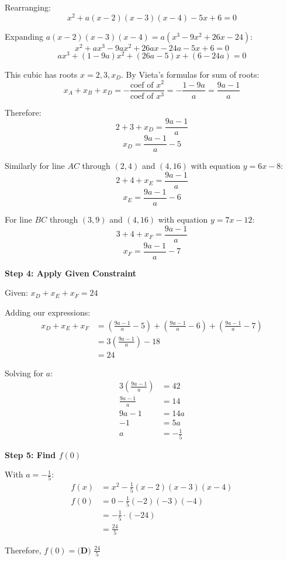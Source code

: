 \documentclass[]{article}
\begin{document}
\begin{solutionbox}
Rearranging:
\[x^2 + a(x-2)(x-3)(x-4) - 5x + 6 = 0\]

Expanding $a(x-2)(x-3)(x-4) = a(x^3 - 9x^2 + 26x - 24)$:
\[x^2 + ax^3 - 9ax^2 + 26ax - 24a - 5x + 6 = 0\]
\[ax^3 + (1-9a)x^2 + (26a-5)x + (6-24a) = 0\]

This cubic has roots $x = 2, 3, x_D$. By Vieta's formulas for sum of roots:
\[x_A + x_B + x_D = -\frac{\text{coef of } x^2}{\text{coef of } x^3} = -\frac{1-9a}{a} = \frac{9a-1}{a}\]

Therefore:
\[2 + 3 + x_D = \frac{9a-1}{a}\]
\[x_D = \frac{9a-1}{a} - 5\]

Similarly for line $AC$ through $(2,4)$ and $(4,16)$ with equation $y = 6x - 8$:
\[2 + 4 + x_E = \frac{9a-1}{a}\]
\[x_E = \frac{9a-1}{a} - 6\]

For line $BC$ through $(3,9)$ and $(4,16)$ with equation $y = 7x - 12$:
\[3 + 4 + x_F = \frac{9a-1}{a}\]
\[x_F = \frac{9a-1}{a} - 7\]

\textbf{Step 4: Apply Given Constraint}

Given: $x_D + x_E + x_F = 24$

Adding our expressions:
\begin{align*}
x_D + x_E + x_F &= \left(\frac{9a-1}{a} - 5\right) + \left(\frac{9a-1}{a} - 6\right) + \left(\frac{9a-1}{a} - 7\right) \\
&= 3\left(\frac{9a-1}{a}\right) - 18 \\
&= 24
\end{align*}

Solving for $a$:
\begin{align*}
3\left(\frac{9a-1}{a}\right) &= 42 \\
\frac{9a-1}{a} &= 14 \\
9a - 1 &= 14a \\
-1 &= 5a \\
a &= -\frac{1}{5}
\end{align*}

\textbf{Step 5: Find $f(0)$}

With $a = -\frac{1}{5}$:
\begin{align*}
f(x) &= x^2 - \frac{1}{5}(x-2)(x-3)(x-4) \\
f(0) &= 0 - \frac{1}{5}(-2)(-3)(-4) \\
&= -\frac{1}{5} \cdot (-24) \\
&= \frac{24}{5}
\end{align*}

Therefore, $f(0) = \boxed{\textbf{(D) } \frac{24}{5}}$
\end{solutionbox}
\end{document}
